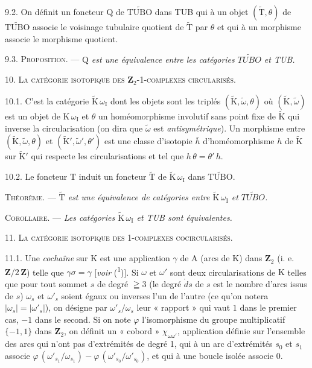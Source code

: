 9.2. On définit un foncteur \(\mathrm{Q}\) de \(\widetilde{\mathrm{TUBO}}\) dans TUB qui à un objet \((\widetilde{\mathrm{T}},\theta)\) de \(\widetilde{\mathrm{TUBO}}\) associe le voisinage tubulaire quotient de \(\widetilde{\mathrm{T}}\) par \(\theta\) et qui à un morphisme associe le morphisme quotient.

9.3. \textsc{Proposition.} --- \textit{\(\mathrm{Q}\) est une équivalence entre les catégories \(\widetilde{\mathit{TUBO}}\) et TUB.}

10. \textsc{La catégorie isotopique des \(\mathbf{Z}_2\)-1-complexes circularisés.}

10.1. C'est la catégorie \(\widetilde{\mathrm{K}}\,\omega_{\mathrm{I}}\) dont les objets sont les triplés \((\widetilde{\mathrm{K}},\widetilde\omega,\theta)\) où \((\widetilde{\mathrm{K}},\widetilde\omega)\) est un objet de \(\mathrm{K}\,\omega_{\mathrm{I}}\) et \(\theta\) un homéomorphisme involutif sans point fixe de \(\widetilde{\mathrm{K}}\) qui inverse la circularisation (on dira que \(\widetilde\omega\) est \textit{antisymétrique}). Un morphisme entre \((\widetilde{\mathrm{K}},\widetilde\omega,\theta)\) et \((\widetilde{\mathrm{K}}',\widetilde\omega',\theta')\) est une classe d'isotopie \(\bar h\) d'homéomorphisme \(h\) de \(\widetilde{\mathrm{K}}\) sur \(\widetilde{\mathrm{K}}'\) qui respecte les circularisations et tel que \(h\,\theta=\theta'\,h\).

10.2. Le foncteur \(\mathrm{T}\) induit un foncteur \(\widetilde{\mathrm{T}}\) de \(\widetilde{\mathrm{K}}\,\omega_{\mathrm{I}}\) dans \(\widetilde{\mathrm{TUBO}}\).

\textsc{Théorème.} --- \textit{\(\widetilde{\mathrm{T}}\) est une équivalence de catégories entre \(\widetilde{\mathrm{K}}\,\omega_{\mathrm{I}}\) et \(\widetilde{\mathit{TUBO}}\).}

\textsc{Corollaire.} --- \textit{Les catégories \(\widetilde{\mathrm{K}}\,\omega_{\mathrm{I}}\) et TUB sont équivalentes.}

11. \textsc{La catégorie isotopique des 1-complexes cocircularisés.}

11.1. Une \textit{cochaîne} sur \(\mathrm{K}\) est une application \(\gamma\) de \(\mathrm{A}\) (arcs de \(\mathrm{K}\)) dans \(\mathbf{Z}_2\) (i. e. \(\mathbf{Z}/2\,\mathbf{Z}\)) telle que \(\gamma\sigma=\gamma\) [\textit{voir} (\textsuperscript{1})]. Si \(\omega\) et \(\omega'\) sont deux circularisations de \(\mathrm{K}\) telles que pour tout sommet \(s\) de degré \(\geqq3\) (le degré \(\mathring{d}s\) de \(s\) est le nombre d'arcs issus de \(s\)) \(\omega_s\) et \(\omega'_s\) soient égaux ou inverses l'un de l'autre (ce qu'on notera \(\lvert\omega_s\rvert=\lvert\omega'_s\rvert\)), on désigne par \(\omega'_s/\omega_s\) leur « rapport » qui vaut \(1\) dans le premier cas, \(-1\) dans le second. Si on note \(\varphi\) l'isomorphisme du groupe multiplicatif \(\{-1,1\}\) dans \(\mathbf{Z}_2\), on définit un « cobord » \(\chi_{\omega\omega'}\), application définie sur l'ensemble des arcs qui n'ont pas d'extrémités de degré 1, qui à un arc d'extrémités \(s_0\) et \(s_1\) associe \(\varphi\,(\omega'_{s_1}/\omega_{s_1})-\varphi\,(\omega'_{s_0}/\omega'_{s_0})\), et qui à une boucle isolée associe \(0\).

